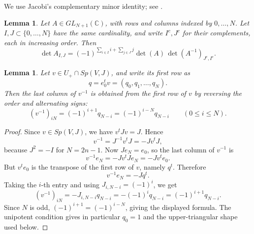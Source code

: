 \documentclass{article}
\newtheorem{lemma}[thm]{Lemma}
\newcommand{\CC}{\mathbb{C}}
\begin{document}
We use Jacobi's complementary minor identity; see \cite[Chapter I, \S4]{Gantmacher}.
\begin{lemma}\label{lem:jacobi-complementary-minor}
Let \(A\in GL_{N+1}(\CC)\), with rows and columns indexed by \(0,\ldots,N\). Let \(I,J\subset\{0,\ldots,N\}\) have the same cardinality, and write \(I^c,J^c\) for their complements, each in increasing order. Then
\[
\det A_{I,J}
=
(-1)^{\sum_{i\in I}i+\sum_{j\in J}j}
\det(A)\,
\det (A^{-1})_{J^c,I^c}.
\]
\end{lemma}

\begin{lemma}\label{lem:symplectic-inverse-last-column}
Let \(v\in U_+\cap Sp(V,J)\), and write its first row as
\[
q=e_0^tv=(q_0,q_1,\ldots,q_N).
\]
Then the last column of \(v^{-1}\) is obtained from the first row of \(v\) by reversing the order and alternating signs:
\[
(v^{-1})_{iN}=(-1)^{i+1}q_{N-i}=(-1)^{i-N}q_{N-i}
\qquad(0\le i\le N).
\]
\end{lemma}

\begin{proof}
Since \(v\in Sp(V,J)\), we have \(v^tJv=J\). Hence
\[
v^{-1}=J^{-1}v^tJ=-Jv^tJ,
\]
because \(J^2=-I\) for \(N=2n-1\). Now \(Je_N=e_0\), so the last column of \(v^{-1}\) is
\[
v^{-1}e_N=-Jv^tJe_N=-Jv^te_0.
\]
But \(v^te_0\) is the transpose of the first row of \(v\), namely \(q^t\). Therefore
\[
v^{-1}e_N=-Jq^t.
\]
Taking the \(i\)-th entry and using \(J_{i,N-i}=(-1)^i\), we get
\[
(v^{-1})_{iN}
=
-J_{i,N-i}q_{N-i}
=
-(-1)^iq_{N-i}
=
(-1)^{i+1}q_{N-i}.
\]
Since \(N\) is odd, \((-1)^{i+1}=(-1)^{i-N}\), giving the displayed formula. The unipotent condition gives in particular \(q_0=1\) and the upper-triangular shape used below.
\end{proof}
\end{document}
